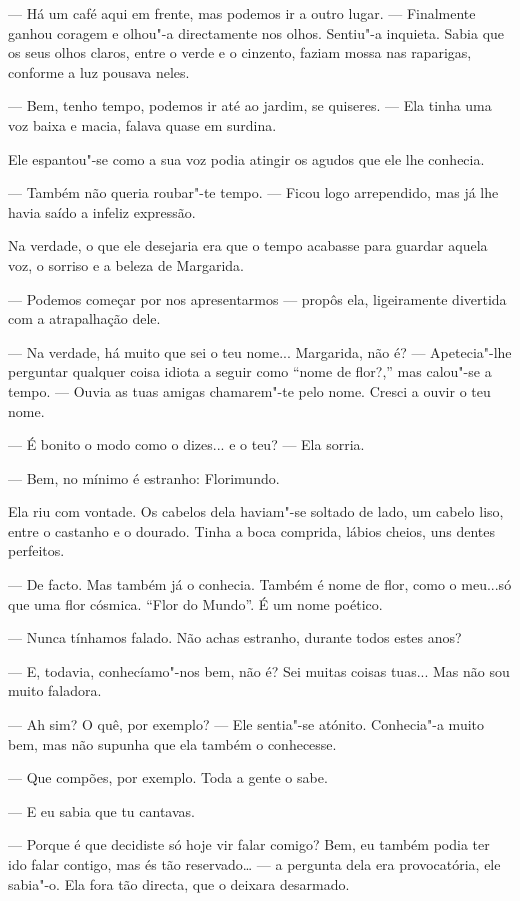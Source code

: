 --- Há um café aqui em frente, mas podemos ir a outro lugar. --- Finalmente
ganhou coragem e olhou"-a directamente nos olhos. Sentiu"-a inquieta.
Sabia que os seus olhos claros, entre o verde e o cinzento, faziam mossa
nas raparigas, conforme a luz pousava neles.

--- Bem, tenho tempo, podemos ir até ao jardim, se quiseres. --- Ela tinha
uma voz baixa e macia, falava quase em surdina.

Ele espantou"-se como a sua voz podia atingir os agudos que ele lhe
conhecia.

--- Também não queria roubar"-te tempo. --- Ficou logo arrependido, mas já
lhe havia saído a infeliz expressão.

Na verdade, o que ele desejaria era que o tempo acabasse para guardar
aquela voz, o sorriso e a beleza de Margarida.

--- Podemos começar por nos apresentarmos --- propôs ela, ligeiramente
divertida com a atrapalhação dele.

--- Na verdade, há muito que sei o teu nome... Margarida, não é? ---
Apetecia"-lhe perguntar qualquer coisa idiota a seguir como ``nome de
flor?,'' mas calou"-se a tempo. --- Ouvia as tuas amigas chamarem"-te pelo
nome. Cresci a ouvir o teu nome.

--- É bonito o modo como o dizes... e o teu? --- Ela sorria.

--- Bem, no mínimo é estranho: Florimundo.

Ela riu com vontade. Os cabelos dela haviam"-se soltado de lado, um
cabelo liso, entre o castanho e o dourado. Tinha a boca comprida, lábios
cheios, uns dentes perfeitos.

--- De facto. Mas também já o conhecia. Também é nome de flor, como o
meu...só que uma flor cósmica. ``Flor do Mundo''. É um nome poético.

--- Nunca tínhamos falado. Não achas estranho, durante todos estes anos?

--- E, todavia, conhecíamo"-nos bem, não é? Sei muitas coisas tuas... Mas
não sou muito faladora.

--- Ah sim? O quê, por exemplo? --- Ele sentia"-se atónito. Conhecia"-a muito
bem, mas não supunha que ela também o conhecesse.

--- Que compões, por exemplo. Toda a gente o sabe.

--- E eu sabia que tu cantavas.

--- Porque é que decidiste só hoje vir falar comigo? Bem, eu também podia
ter ido falar contigo, mas és tão reservado\ldots{} --- a pergunta dela
era provocatória, ele sabia"-o. Ela fora tão directa, que o deixara
desarmado.

